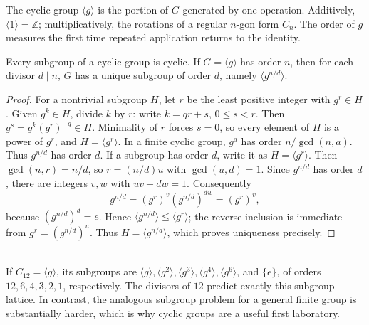 The cyclic group \(\langle g\rangle\) is the portion of \(G\) generated by one
operation.  Additively, \(\langle 1\rangle=\mathbb Z\); multiplicatively, the
rotations of a regular \(n\)-gon form \(C_n\).  The order of \(g\) measures the
first time repeated application returns to the identity.

\begin{proposition}
Every subgroup of a cyclic group is cyclic.  If \(G=\langle g\rangle\) has
order \(n\), then for each divisor \(d\mid n\), \(G\) has a unique subgroup of
order \(d\), namely \(\langle g^{n/d}\rangle\).
\end{proposition}
\begin{proof}
For a nontrivial subgroup \(H\), let \(r\) be the least positive integer with
\(g^r\in H\).  Given \(g^k\in H\), divide \(k\) by \(r\): write
\(k=qr+s\), \(0\leq s<r\).  Then \(g^s=g^k(g^r)^{-q}\in H\).  Minimality of
\(r\) forces \(s=0\), so every element of \(H\) is a power of \(g^r\), and
\(H=\langle g^r\rangle\).  In a finite cyclic group, \(g^a\) has order
\(n/\gcd(n,a)\).  Thus \(g^{n/d}\) has order \(d\).  If a subgroup has order
\(d\), write it as \(H=\langle g^r\rangle\).  Then
\(\gcd(n,r)=n/d\), so \(r=(n/d)u\) with \(\gcd(u,d)=1\).  Since
\(g^{n/d}\) has order \(d\), there are integers \(v,w\) with
\(uv+dw=1\).  Consequently
\[
 g^{n/d}=(g^r)^v(g^{n/d})^{dw}=(g^r)^v,
\]
because \((g^{n/d})^d=e\).  Hence
\(\langle g^{n/d}\rangle\leq\langle g^r\rangle\); the reverse inclusion is
immediate from \(g^r=(g^{n/d})^u\).  Thus
\(H=\langle g^{n/d}\rangle\), which proves uniqueness precisely.
\end{proof}

\begin{example}
\leavevmode\\
If \(C_{12}=\langle g\rangle\), its subgroups are
\(\langle g\rangle,\langle g^2\rangle,\langle g^3\rangle,
\langle g^4\rangle,\langle g^6\rangle\), and \(\{e\}\), of orders
\(12,6,4,3,2,1\), respectively.  The divisors of \(12\) predict exactly this
subgroup lattice.  In contrast, the analogous subgroup problem for a general
finite group is substantially harder, which is why cyclic groups are a useful
first laboratory.
\end{example}

